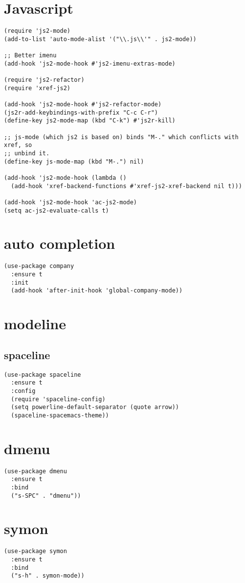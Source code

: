 \documentclass[11pt]{article}
\begin{document}
\section{Javascript}
\label{sec-14}
\begin{verbatim}
(require 'js2-mode)
(add-to-list 'auto-mode-alist '("\\.js\\'" . js2-mode))

;; Better imenu
(add-hook 'js2-mode-hook #'js2-imenu-extras-mode)

(require 'js2-refactor)
(require 'xref-js2)

(add-hook 'js2-mode-hook #'js2-refactor-mode)
(js2r-add-keybindings-with-prefix "C-c C-r")
(define-key js2-mode-map (kbd "C-k") #'js2r-kill)

;; js-mode (which js2 is based on) binds "M-." which conflicts with xref, so
;; unbind it.
(define-key js-mode-map (kbd "M-.") nil)

(add-hook 'js2-mode-hook (lambda ()
  (add-hook 'xref-backend-functions #'xref-js2-xref-backend nil t)))

(add-hook 'js2-mode-hook 'ac-js2-mode)
(setq ac-js2-evaluate-calls t)
\end{verbatim}
\section{auto completion}
\label{sec-15}
\begin{verbatim}
(use-package company
  :ensure t
  :init
  (add-hook 'after-init-hook 'global-company-mode))
\end{verbatim}
\section{modeline}
\label{sec-16}
\subsection{spaceline}
\label{sec-16-1}
\begin{verbatim}
(use-package spaceline
  :ensure t
  :config
  (require 'spaceline-config)
  (setq powerline-default-separator (quote arrow))
  (spaceline-spacemacs-theme))
\end{verbatim}
\section{dmenu}
\label{sec-17}
\begin{verbatim}
(use-package dmenu
  :ensure t
  :bind
  ("s-SPC" . "dmenu"))
\end{verbatim}
\section{symon}
\label{sec-18}
\begin{verbatim}
(use-package symon
  :ensure t
  :bind
  ("s-h" . symon-mode))
\end{verbatim}
\end{document}
